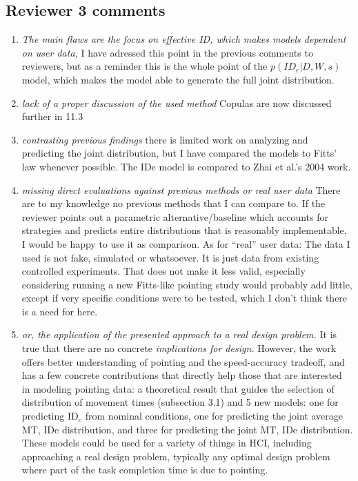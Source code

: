 \documentclass{article}
\begin{document}
\subsection*{Reviewer 3 comments}
\begin{enumerate}
    \item \textit{The main flaws are the focus on effective ID, which makes models dependent on user data,} I have adressed this point in the previous comments to reviewers, but as a reminder this is the whole point of the $p(ID_e|D,W,s)$ model, which makes the model able to generate the full joint distribution.
    \item \textit{lack of a proper discussion of the used method} Copulas are now discussed further in 11.3
    \item \textit{contrasting previous findings} there is limited work on analyzing and predicting the joint distribution, but I have compared the models to Fitts' law whenever possible. The IDe model is compared to Zhai et al.'s 2004 work.
    \item \textit{missing direct evaluations against previous methods or real user data} There are to my knowledge no previous methods that I can compare to. If the reviewer points out a parametric alternative/baseline which accounts for strategies and predicts entire distributions that is reasonably implementable, I would be happy to use it as comparison. As for ``real'' user data: The data I used is not fake, simulated or whatsoever. It is just data from existing controlled experiments. That does not make it less valid, especially considering running a new Fitts-like pointing study would probably add little, except if very specific conditions were to be tested, which I don't think there is a need for here.
    \item \textit{or, the application of the presented approach to a real design problem.} It is true that there are no concrete \textit{implications for design.} However, the work offers better understanding of pointing and the speed-accuracy tradeoff, and has a few concrete contributions that directly help those that are interested in modeling pointing data: a theoretical result that guides the selection of distribution of movement times (subsection 3.1) and 5 new models: one for predicting ID$_e$ from nominal conditions, one for predicting the joint average MT, IDe distribution, and three for predicting the joint MT, IDe distribution. These models could be used for a variety of things in HCI, including approaching a real design problem, typically any optimal design problem where part of the task completion time is due to pointing. 

\end{enumerate}
\end{document}
